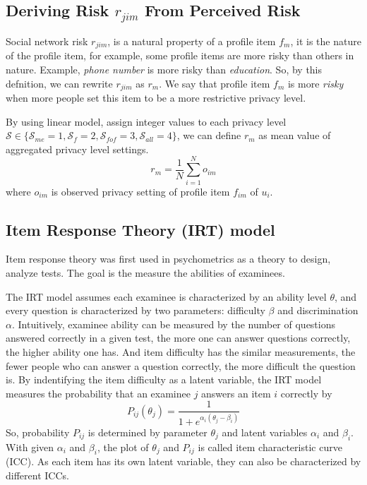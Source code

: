 \documentclass[a4paper]{article}
\begin{document}
\subsection{Deriving Risk $r_{jim}$ From Perceived Risk}
Social network risk $r_{jim}$, is a natural property of a profile item
$f_{m}$, it is the nature of the profile item, for example, some
profile items are more risky than others in nature. Example,
\emph{phone number} is more risky than \emph{education}. So, by this
defnition, we can rewrite $r_{jim}$ as $r_m$. We say that profile item
$f_m$ is more \emph{risky} when more people set this item to be a more
restrictive privacy level.

By using linear model, assign integer values to each privacy level
$\mathcal{S}\in \{\mathcal{S}_{me}=1, \mathcal{S}_{f}=2,
\mathcal{S}_{fof}=3, \mathcal{S}_{all}=4\}$, we can define $r_m$ as
mean value of aggregated privacy level settings.
\[ r_m = \frac{1}{N} \sum_{i=1}^No_{im} \]
where $o_{im}$ is observed privacy setting of profile item $f_{im}$
of $u_i$.

\subsection{Item Response Theory (IRT) model}
Item response theory was first used in psychometrics as a theory
to design, analyze tests. The goal is the measure the abilities of
examinees. 

The IRT model assumes each examinee is characterized by an ability
level $\theta$, and every question is characterized by two parameters:
difficulty $\beta$ and discrimination $\alpha$. Intuitively, examinee
ability can be measured by the number of questions answered correctly
in a given test, 
the more one can answer questions correctly, the higher ability
one has. And item difficulty has the similar measurements, the fewer
people who can answer a question correctly, the more difficult the
question is. By indentifying the item difficulty as a latent variable,
the IRT model measures the probability that an examinee $j$ answers an
item $i$ correctly by 
\begin{equation}
  P_{ij}(\theta_j) = \frac{1}{1+e^{\alpha_i(\theta_j-\beta_i)}}
\end{equation}
So, probability $P_{ij}$ is determined by parameter $\theta_j$ and
latent variables $\alpha_i$ and $\beta_i$. With given $\alpha_i$ and
$\beta_i$, the plot of $\theta_j$ and $P_{ij}$ is called item
characteristic curve (ICC). As each item has its own latent variable,
they can also be characterized by different ICCs. 
\end{document}
